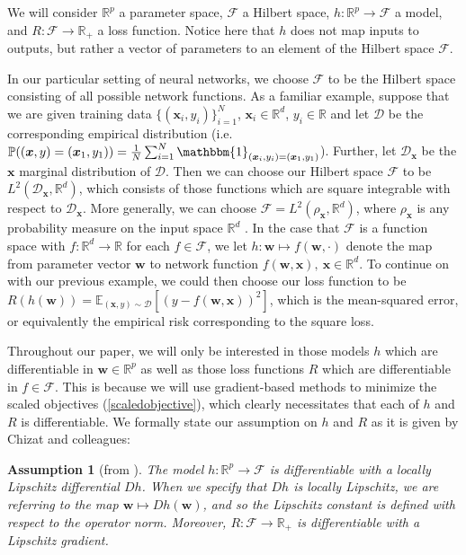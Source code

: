 \documentclass{article}
\newtheorem*{assumption}{Assumption}
\begin{document}
We will consider $\mathbb{R}^p$ a parameter space, $\mathcal{F}$ a Hilbert space, $h: \mathbb{R}^p \rightarrow \mathcal{F}$ a model, and $R: \mathcal{F} \rightarrow \mathbb{R}_+$ a loss function. Notice here that $h$ does not map inputs to outputs, but rather a vector of parameters to an element of the Hilbert space $\mathcal{F}$.

In our particular setting of neural networks, we choose $\mathcal{F}$ to be the Hilbert space consisting of all possible network functions. As a familiar example, suppose that we are given training data $\{ (\boldsymbol{x}_i, y_i)\}_{i=1}^N$, $\boldsymbol{x}_i \in \mathbb{R}^d$, $y_i \in \mathbb{R}$ and let $\mathcal{D}$ be the corresponding empirical distribution (i.e. $\mathbb{P}( (\boldsymbol{x}, y) = (\boldsymbol{x}_1, y_1)) = \frac{1}{N} \sum_{i=1}^N \mathbbm{1}_{(\boldsymbol{x}_i, y_i) = (\boldsymbol{x}_1, y_1)}$). Further, let $\mathcal{D}_{\boldsymbol{x}}$ be the $\boldsymbol{x}$ marginal distribution of $\mathcal{D}$. Then we can choose our Hilbert space $\mathcal{F}$ to be $L^2(\mathcal{D}_{\boldsymbol{x}}, \mathbb{R}^d)$, which consists of those functions which are square integrable with respect to $\mathcal{D}_{\boldsymbol{x}}$. More generally, we can choose $\mathcal{F} = L^2(\rho_{\boldsymbol{x}}, \mathbb{R}^d)$, where $\rho_{\boldsymbol{x}}$ is any probability measure on the input space $\mathbb{R}^d$ \cite{chizat2018lazy}. In the case that $\mathcal{F}$ is a function space with $f: \mathbb{R}^d \rightarrow \mathbb{R}$ for each $f \in \mathcal{F}$, we let $h: \boldsymbol{w} \mapsto f(\boldsymbol{w}, \cdot)$ denote the map from parameter vector $\boldsymbol{w}$ to network function $f(\boldsymbol{w}, \boldsymbol{x}), \ \boldsymbol{x} \in \mathbb{R}^d$. To continue on with our previous example, we could then choose our loss function to be $R(h(\boldsymbol{w})) = \mathbb{E}_{(\boldsymbol{x}, y) \sim \mathcal{D}} \left[ (y - f(\boldsymbol{w}, \boldsymbol{x}))^2 \right]$, which is the mean-squared error, or equivalently the empirical risk corresponding to the square loss.

Throughout our paper, we will only be interested in those models $h$ which are differentiable in $\boldsymbol{w} \in \mathbb{R}^p$ as well as those loss functions $R$ which are differentiable in $f \in \mathcal{F}$. This is because we will use gradient-based methods to minimize the scaled objectives (\ref{scaledobjective}), which clearly necessitates that each of $h$ and $R$ is differentiable. We formally state our assumption on $h$ and $R$ as it is given by Chizat and colleagues:
\begin{assumption}[from \cite{chizat2018lazy}]\label{assumption1}
The model $h: \mathbb{R}^p \rightarrow \mathcal{F}$ is differentiable with a locally Lipschitz differential $Dh$. When we specify that $Dh$ is locally Lipschitz, we are referring to the map $\boldsymbol{w} \mapsto Dh(\boldsymbol{w})$, and so the Lipschitz constant is defined with respect to the operator norm. Moreover, $R: \mathcal{F} \rightarrow \mathbb{R}_+$ is differentiable with a Lipschitz gradient.
\end{assumption}
\end{document}
